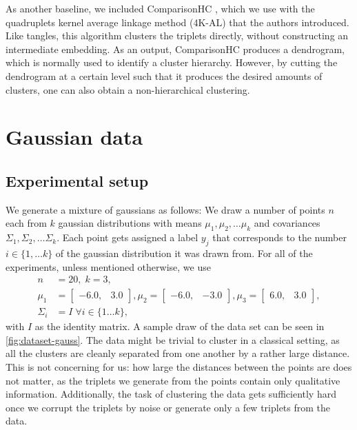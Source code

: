 As another baseline, we included ComparisonHC \citep{ghoshdastidarFoundationsComparisonBasedHierarchical2019}, which we use with the quadruplets kernel average linkage method (4K-AL) 
that the authors introduced.
Like tangles, this algorithm clusters the triplets directly, without constructing an intermediate embedding.
As an output, ComparisonHC produces a dendrogram, which is normally used to identify a cluster hierarchy. However, by cutting the dendrogram at a certain level such that it produces the desired 
amounts of clusters, one can also obtain a non-hierarchical clustering. \\

\section{Gaussian data}\label{sec:gaussian_data}
\subsection{Experimental setup}
We generate a mixture of gaussians as follows: We draw a number of points $n$ each from $k$ gaussian distributions with means $\mu_1, \mu_2, \ldots \mu_k$ and 
covariances $\Sigma_1, \Sigma_2, \ldots \Sigma_k$. Each point gets assigned a label $y_j$ that corresponds to the number $i \in \{1, \ldots k\}$ of the gaussian distribution it was drawn from.
For all of the experiments, unless mentioned otherwise, we use 
\begin{align*}
    n&=20,\; k=3, \\
    \mu_1 &= \begin{bmatrix} -6.0, & 3.0 \end{bmatrix}, \mu_2 = \begin{bmatrix} -6.0, & -3.0 \end{bmatrix},  \mu_3 = \begin{bmatrix} 6.0, & 3.0 \end{bmatrix}, \\
    \Sigma_i &= I \;\forall i \in \{ 1\ldots k\},
\end{align*}
with $I$ as the identity matrix. A sample draw of the data set can be seen in \autoref{fig:dataset-gauss}. The data might be trivial to cluster in a classical setting, as all the 
clusters are cleanly separated from one another by a rather large distance. This is not concerning for us: how large the distances between the points are does not matter, as 
the triplets we generate from the points contain only qualitative information. Additionally, the task of clustering the data gets sufficiently hard once we corrupt the triplets 
by noise or generate only a few triplets from the data.

